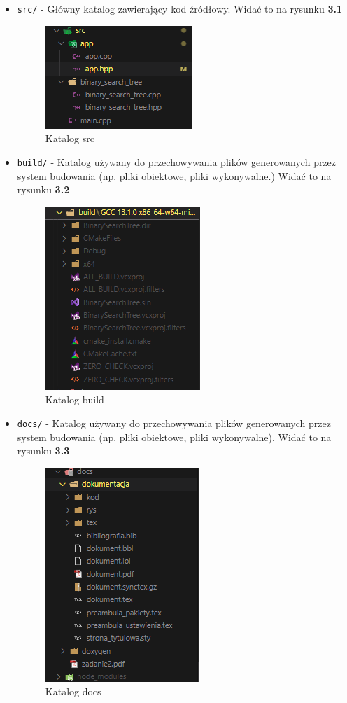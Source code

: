 \begin{itemize}
	\item \texttt{src/} - Główny katalog zawierający kod źródłowy. Widać to na rysunku \textbf{3.1}
	      \begin{figure}[htb!]
		      \centering
		      \includegraphics[width=0.4\linewidth]{rys/src.png}
		      \caption{Katalog src}
	      \end{figure}
	\item \texttt{build/} - Katalog używany do przechowywania plików generowanych przez system budowania (np. pliki obiektowe, pliki wykonywalne.) Widać to na rysunku \textbf{3.2}
	      \begin{figure}[htb!]
		      \centering
		      \includegraphics[width=0.3\linewidth]{rys/docs.png}
		      \caption{Katalog build}
	      \end{figure}
	      \newpage
	\item \texttt{docs/} - Katalog używany do przechowywania plików generowanych przez system budowania (np. pliki obiektowe, pliki wykonywalne). Widać to na rysunku \textbf{3.3}
	      \begin{figure}[htb!]
		      \centering
		      \includegraphics[width=0.4\linewidth]{rys/kat_dosc.png}
		      \caption{Katalog docs}
	      \end{figure}
\end{itemize}

